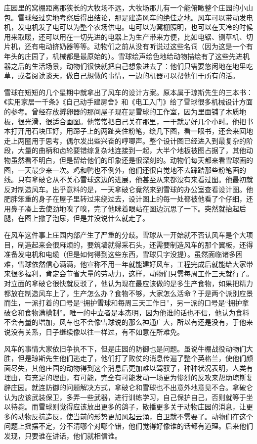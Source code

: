 庄园里的窝棚距离那狭长的大牧场不远，大牧场那儿有一个能俯瞰整个庄园的小山包。雪球经过实地考察后得出结论，那是建造风车的绝佳之地。风车可以带动发电机，发电机发了电可以为整个农场供电。电可以为窝棚照明，也可以在天冷的时候用来取暖，还可以用在一切先进的电器上为生产带来方便，比如电锯、铡草机、切片机，还有电动挤奶器等等。动物们之前从没有听说过这些名词（因为这是一个有年头的庄园了，机械都是最原始的）。雪球绘声绘色地给动物描绘有了这些先进机器之后的生活场景，动物们很快就把自己想象进去了：他们只需要悠闲地在地里吃草，或者阅读谈天，做自己想做的事情，一边的机器可以帮他们干所有的活。

雪球在短短的几个星期中就拿出了风车的设计方案。原本属于琼斯先生的三本书：《实用家居一千条》《自己动手建房舍》和《电工入门》给了雪球很多机械设计方面的参考。曾经存放孵卵器的那间屋子现在是雪球的工作室，因为里面铺了木质地板，很光滑，很适合画图。他常常把自己关在那里，一干就是好几个小时。他把书本打开用石块压好，用蹄子上的两趾夹住粉笔，绘几下图，看一眼书，还会来回地走上两圈用于思考，偶尔发出些兴奋的哼唧声。整个设计图已经进入到最复杂的阶段，大量的曲柄和齿轮要错综复杂地连接到一起，大半个地板被图占据了，其他动物虽然看不明白，但是留给他们的印象还是很深刻的。动物们每天都来看雪球画的图，一天最少来一次。鸡和鸭也不例外，他们还很自觉地不去踩踏那些粉笔画的线。只有拿破仑从不关心雪球这边的进展，他甚至从来都没有来看过图。他最初就反对制造风车。出乎意料的是，一天拿破仑竟然来到雪球的办公室查看设计图。他肥胖笨重的身子在屋子里转过来绕过去，设计图上的每一处都被他看了个仔细，还用鼻子凑上去使劲地嗅了嗅，完了他眯着眼站在图边沉思了一下。突然就抬起后腿，在图上撒了泡尿，但是并没说什么就走了。

在风车这件事上庄园内部产生了严重的分歧。雪球从一开始就不否认风车是个大项目，制造起来会很麻烦的，要筑墙就得采石头，还需要制造风车的那个翼板，还得准备发电机和电缆（但是如何得到这些东西，雪球只字没提）。虽然面临诸多困难，雪球依然信心满满，他宣称不用一年就能建好风车，工程完成后就能给大家带来很多福利，肯定会节省大量的劳动力，这样，动物们只需每周工作三天就行了。对立面的拿破仑很快就反驳了，他认为现在最应该做的是多生产食物，如果把精力都放在制造风车上了，生产怎么办？食物不够，大家怎么活命？于是两个派别应景而生，一派打着的口号是“拥护雪球和每周三天工作日”，另一派的口号是“拥护拿破仑和食物满槽制”。唯一的中立者是本杰明，因为他谁的话也不信，他认为食料不会有量的增加，风车也不会像雪球说的那么神通广大，所以有还是没有，于他来说没有关系，日子继续像以往一样过，有不如意在所难免。

风车的事情大家依旧争执不下，但是庄园的防御也是问题。虽说牛棚战役动物们大胜，但是琼斯先生他们逃走了，他们打了败仗的消息传遍了整个英格兰，使他们颜面尽失，其他庄园的动物得到这个消息后更加难以驾驭了，种种状况表明，人类有理由，有充足的理由，有可能，完全有可能发动一场更为惨烈的反攻来帮助琼斯复辟庄园。就连防御的问题解决方式，拿破仑和雪球也不出意外地意见不合。拿破仑认为应该武装保卫，多弄一些武器，进行训练学习，自己保护自己，否则就等于坐以待毙。而雪球则觉得应该放出更多的鸽子，散播更多关于动物庄园的消息，让更多的动物反抗造反，使当前的形势更加风起云涌，自卫就不需要了。动物们在这个问题上摇摆不定，分不清哪个对哪个错，他们觉得好像谁的话都有道理。后来他们发现，只要谁在讲话，他们就相信谁。

